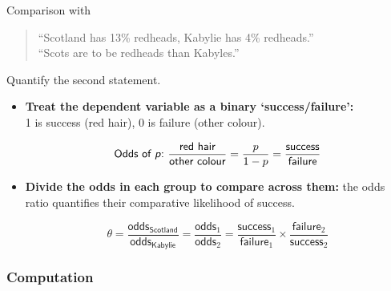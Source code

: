 \documentclass[t]{beamer}
\begin{document}
	\begin{frame}[t]{Comparison with }
					
		\begin{quote}
		``Scotland has 13\% redheads, Kabylie has 4\% redheads.''\\
		``Scots are  to be redheads than Kabyles.''
		\end{quote}
		
		Quantify the second statement.

		\begin{itemize}
			\item \textbf{Treat the dependent variable as a binary `success/failure':}\\1 is success (red hair), 0 is failure (other colour).
						
			$$\textsf{Odds of \textit{p}:~}\frac{\textsf{red hair}}{\textsf{other colour}}=\frac{p}{1-p}=\frac{\textsf{success}}{\textsf{failure}}$$
			\vspace{0em}
			
			\item \textbf{Divide the odds in each group to compare across them:} the odds ratio quantifies their comparative likelihood of success.
			
			$$\theta = \frac{\textsf{odds}_{\textsf{Scotland}}}{\textsf{odds}_{\textsf{Kabylie}}}=\frac{\textsf{odds}_1}{\textsf{odds}_2}=\frac{\textsf{success}_1}{\textsf{failure}_1}\times\frac{\textsf{failure}_2}{\textsf{success}_2}$$
						
		\end{itemize}

	\end{frame}
	
	\subsubsection{Computation}
\end{document}
